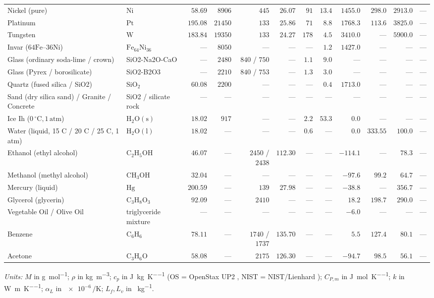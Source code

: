 {\begin{tabularx}{\linewidth}{@{}X l r r r r r r r r r r@{}}
Nickel (pure) & $\mathrm{Ni}$ & $58.69$ & $8906$ & $445$ & $26.07$ & $91$ & $13.4$ & $1455.0$ & $298.0$ & $2913.0$ & ---\\
Platinum & $\mathrm{Pt}$ & $195.08$ & $21450$ & $133$ & $25.86$ & $71$ & $8.8$ & $1768.3$ & $113.6$ & $3825.0$ & ---\\
Tungsten & $\mathrm{W}$ & $183.84$ & $19350$ & $133$ & $24.27$ & $178$ & $4.5$ & $3410.0$ & --- & $5900.0$ & ---\\
Invar ($64\mathrm{Fe}\text{--}36\mathrm{Ni}$) & $\mathrm{Fe_{64}Ni_{36}}$ & --- & $8050$ & --- & --- & --- & $1.2$ & $1427.0$ & --- & --- & ---\\
Glass (ordinary soda-lime / crown) & SiO2-Na2O-CaO & --- & $2480$ & $840$ / $750$ & --- & $1.1$ & $9.0$ & --- & --- & --- & ---\\
Glass (Pyrex / borosilicate) & SiO2-B2O3 & --- & $2210$ & $840$ / $753$ & --- & $1.3$ & $3.0$ & --- & --- & --- & ---\\
Quartz (fused silica / SiO2) & $\mathrm{SiO_2}$ & $60.08$ & $2200$ & --- & --- & --- & $0.4$ & $1713.0$ & --- & --- & ---\\
Sand (dry silica sand) / Granite / Concrete & SiO2 / silicate rock & --- & --- & --- & --- & --- & --- & --- & --- & --- & ---\\
Ice Ih ($0\,^\circ\mathrm{C}, 1\,\mathrm{atm}$) & $\mathrm{H_2O(s)}$ & $18.02$ & $917$ & --- & --- & $2.2$ & $53.3$ & $0.0$ & --- & --- & ---\\
Water (liquid, 15 C / 20 C / 25 C, 1 atm) & $\mathrm{H_2O(l)}$ & $18.02$ & --- & --- & --- & $0.6$ & --- & $0.0$ & $333.55$ & $100.0$ & ---\\
Ethanol (ethyl alcohol) & $\mathrm{C_2H_5OH}$ & $46.07$ & --- & $2450$ / $2438$ & $112.30$ & --- & --- & $-114.1$ & --- & $78.3$ & ---\\
Methanol (methyl alcohol) & $\mathrm{CH_3OH}$ & $32.04$ & --- & --- & --- & --- & --- & $-97.6$ & $99.2$ & $64.7$ & ---\\
Mercury (liquid) & $\mathrm{Hg}$ & $200.59$ & --- & $139$ & $27.98$ & --- & --- & $-38.8$ & --- & $356.7$ & ---\\
Glycerol (glycerin) & $\mathrm{C_3H_8O_3}$ & $92.09$ & --- & $2410$ & --- & --- & --- & $18.2$ & $198.7$ & $290.0$ & ---\\
Vegetable Oil / Olive Oil & triglyceride mixture & --- & --- & --- & --- & --- & --- & $-6.0$ & --- & --- & ---\\
Benzene & $\mathrm{C_6H_6}$ & $78.11$ & --- & $1740$ / $1737$ & $135.70$ & --- & --- & $5.5$ & $127.4$ & $80.1$ & ---\\
Acetone & $\mathrm{C_3H_6O}$ & $58.08$ & --- & $2175$ & $126.30$ & --- & --- & $-94.7$ & $98.5$ & $56.1$ & ---\\
\bottomrule
\end{tabularx}}
{\scriptsize\noindent\emph{Units:} $M$ in \si{\gram\per\mole}; $\rho$ in \si{\kilogram\per\cubic\meter}; $c_p$ in \si{\joule\per\kilogram\per\kelvin} (OS = OpenStax UP2 , NIST = NIST/Lienhard ); $C_{P,m}$ in \si{\joule\per\mole\per\kelvin}; $k$ in \si{\watt\per\meter\per\kelvin}; $\alpha_L$ in $\num{e-6}\,\si{\per\kelvin}$; $L_f, L_v$ in \si{\kilojoule\per\kilogram}.}

